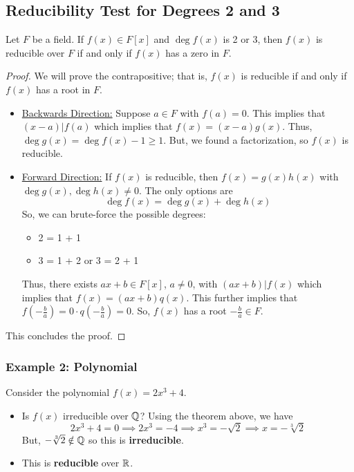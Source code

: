 \documentclass[letterpaper]{article}
\begin{document}
\subsection{Reducibility Test for Degrees 2 and 3}
\begin{theorem}{}{}
    Let $F$ be a field. If $f(x) \in F[x]$ and $\deg f(x)$ is 2 or 3, then $f(x)$ is reducible over $F$ if and only if $f(x)$ has a zero in $F$. 
\end{theorem}

\begin{mdframed}[]
    \begin{proof}
        We will prove the contrapositive; that is, $f(x)$ is reducible if and only if $f(x)$ has a root in $F$. 
        \begin{itemize}
            \item \underline{Backwards Direction:} Suppose $a \in F$ with $f(a) = 0$. This implies that $(x - a) | f(a)$ which implies that $f(x) = (x - a)g(x)$. Thus, $\deg g(x) = \deg f(x) - 1 \geq 1$. But, we found a factorization, so $f(x)$ is reducible. 
            \item \underline{Forward Direction:} If $f(x)$ is reducible, then $f(x) = g(x) h(x)$ with $\deg g(x), \deg h(x) \neq 0$. The only options are 
            \[\deg f(x) = \deg g(x) + \deg h(x)\]
            So, we can brute-force the possible degrees: 
            \begin{itemize}
                \item 2 = 1 + 1
                \item 3 = 1 + 2 or 3 = 2 + 1
            \end{itemize}
            Thus, there exists $ax + b \in F[x]$, $a \neq 0$, with $(ax + b) | f(x)$ which implies that $f(x) = (ax + b)q(x)$. This further implies that $f\left(-\frac{b}{a}\right) = 0 \cdot q\left(-\frac{b}{a}\right) = 0$. So, $f(x)$ has a root $-\frac{b}{a} \in F$. 
        \end{itemize}
        This concludes the proof. 
    \end{proof}
\end{mdframed}

\subsubsection{Example 2: Polynomial}
Consider the polynomial $f(x) = 2x^3 + 4$. 
\begin{itemize}
    \item Is $f(x)$ irreducible over $\mathbb{Q}$? Using the theorem above, we have 
    \[2x^3 + 4 = 0 \implies 2x^3 = -4 \implies x^3 = -\sqrt{2} \implies x = - \sqrt[3]{2}\]
    But, $-\sqrt[3]{2} \notin \mathbb{Q}$ so this is \textbf{irreducible}.

    \item This is \textbf{reducible} over $\mathbb{R}$. 
\end{itemize}
\end{document}
